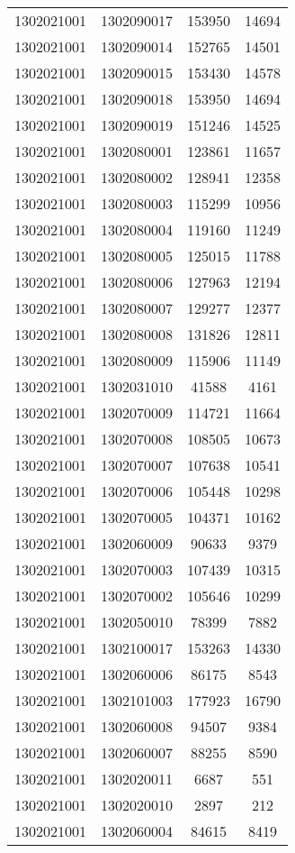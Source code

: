 \begin{longtable}{llcc}
1302021001 & 1302090017 & 153950 & 14694\\
1302021001 & 1302090014 & 152765 & 14501\\
1302021001 & 1302090015 & 153430 & 14578\\
1302021001 & 1302090018 & 153950 & 14694\\
1302021001 & 1302090019 & 151246 & 14525\\
1302021001 & 1302080001 & 123861 & 11657\\
1302021001 & 1302080002 & 128941 & 12358\\
1302021001 & 1302080003 & 115299 & 10956\\
1302021001 & 1302080004 & 119160 & 11249\\
1302021001 & 1302080005 & 125015 & 11788\\
1302021001 & 1302080006 & 127963 & 12194\\
1302021001 & 1302080007 & 129277 & 12377\\
1302021001 & 1302080008 & 131826 & 12811\\
1302021001 & 1302080009 & 115906 & 11149\\
1302021001 & 1302031010 & 41588 & 4161\\
1302021001 & 1302070009 & 114721 & 11664\\
1302021001 & 1302070008 & 108505 & 10673\\
1302021001 & 1302070007 & 107638 & 10541\\
1302021001 & 1302070006 & 105448 & 10298\\
1302021001 & 1302070005 & 104371 & 10162\\
1302021001 & 1302060009 & 90633 & 9379\\
1302021001 & 1302070003 & 107439 & 10315\\
1302021001 & 1302070002 & 105646 & 10299\\
1302021001 & 1302050010 & 78399 & 7882\\
1302021001 & 1302100017 & 153263 & 14330\\
1302021001 & 1302060006 & 86175 & 8543\\
1302021001 & 1302101003 & 177923 & 16790\\
1302021001 & 1302060008 & 94507 & 9384\\
1302021001 & 1302060007 & 88255 & 8590\\
1302021001 & 1302020011 & 6687 & 551\\
1302021001 & 1302020010 & 2897 & 212\\
1302021001 & 1302060004 & 84615 & 8419\\

\end{longtable}

